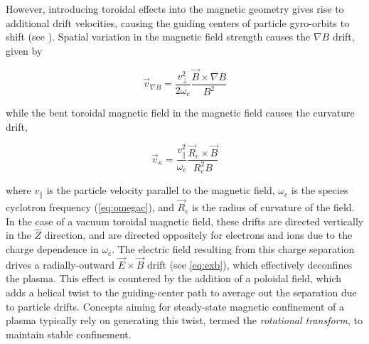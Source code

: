 However, introducing toroidal effects into the magnetic geometry gives rise to additional drift velocities, causing the guiding centers of particle gyro-orbits to shift (see \cite[\S~8.5-7]{Freidberg2007}).  Spatial variation in the magnetic field strength causes the $\nabla B$ drift, given by

\begin{equation}\label{eq:gradbdrift}
 \vec{v}_{\nabla B} = \frac{v_\perp^2}{2\omega_c} \frac{\vec{B} \times \nabla B}{B^2}
\end{equation}

\noindent while the bent toroidal magnetic field in the magnetic field causes the curvature drift,

\begin{equation}\label{eq:curvaturedrift}
 \vec{v}_\kappa = \frac{v_\parallel^2}{\omega_c} \frac{\vec{R}_c \times \vec{B}}{R_c^2 B}
\end{equation}

\noindent where $v_\parallel$ is the particle velocity parallel to the magnetic field, $\omega_c$ is the species cyclotron frequency (\cref{eq:omegac}), and $\vec{R}_c$ is the radius of curvature of the field.  In the case of a vacuum toroidal magnetic field, these drifts are directed vertically in the $\hat{Z}$ direction, and are directed oppositely for electrons and ions due to the charge dependence in $\omega_c$.  The electric field resulting from this charge separation drives a radially-outward $\vec{E} \times \vec{B}$ drift (see \cref{eq:exb}), which effectively deconfines the plasma.  This effect is countered by the addition of a poloidal field, which adds a helical twist to the guiding-center path to average out the separation due to particle drifts.  Concepts aiming for steady-state magnetic confinement of a plasma typically rely on generating this twist, termed the \emph{rotational transform}, to maintain stable confinement.
 
